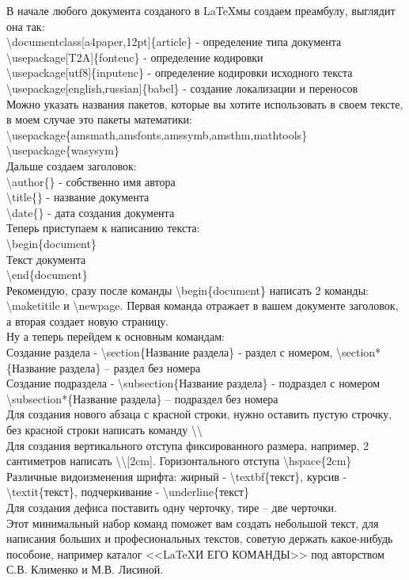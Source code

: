 \documentclass[a4paper,12pt]{article} %
\begin{document}
В начале любого документа созданого в \LaTeX  мы создаем преамбулу, выглядит она так: \\[5mm]
\textbackslash documentclass[a4paper,12pt]\{article\} - определение типа документа\\ 
\textbackslash usepackage[T2A]\{fontenc\} - определение кодировки\\
\textbackslash usepackage[utf8]\{inputenc\} - определение кодировки исходного текста\\
\textbackslash usepackage[english,russian]\{babel\} - создание локализации и переносов\\[5mm]
Можно указать названия пакетов, которые вы хотите использовать в своем тексте, в моем случае это пакеты математики:\\[5mm]
\textbackslash usepackage\{amsmath,amsfonts,amssymb,amsthm,mathtools\} \\
\textbackslash usepackage\{wasysym\} \\[5mm]
Дальше создаем заголовок:\\[5mm]
\textbackslash author\{\} - собственно имя автора\\
\textbackslash title\{\} - название документа\\
\textbackslash date\{\} - дата создания документа\\[5mm]
Теперь приступаем к написанию текста:\\[5mm]
\textbackslash begin\{document\} \\[5mm]
Текст документа \\[5mm]
\textbackslash end\{document\} \\[5mm]
Рекомендую, сразу после команды \textbackslash begin\{document\} написать 2 команды: \textbackslash maketitile и \textbackslash newpage. Первая команда отражает в вашем документе заголовок, а вторая создает новую страницу.\\[5mm]
Ну а теперь перейдем к основным командам:\\[2mm]
Создание раздела - \textbackslash section\{Название раздела\} - раздел с номером, \textbackslash section*\{Название раздела\} – раздел без номера\\[2mm]
Создание подраздела - \textbackslash subsection\{Название раздела\} - подраздел с номером \textbackslash subsection*\{Название раздела\} – подраздел без номера\\[2mm]
Для создания нового абзаца с красной строки, нужно оставить пустую строчку, без красной строки написать команду \textbackslash \textbackslash \\[2mm]
Для создания вертикального отступа фиксированного размера, например, 2 сантиметров написать \textbackslash \textbackslash [2cm]. Горизонтального отступа \textbackslash hspace\{2cm\}\\[2mm]
Различные видоизменения шрифта: жирный - \textbackslash textbf\{текст\}, курсив - \textbackslash textit\{текст\}, подчеркивание - \textbackslash underline\{текст\}\\[2mm]
Для создания дефиса поставить одну черточку, тире – две черточки.\\[5mm]
Этот минимальный набор команд поможет вам создать небольшой текст, для написания больших и професиональных текстов, советую держать какое-нибудь пособоие, например каталог <<\LaTeX  И ЕГО КОМАНДЫ>> под авторством С.В. Клименко и М.В. Лисиной.
\end{document}
